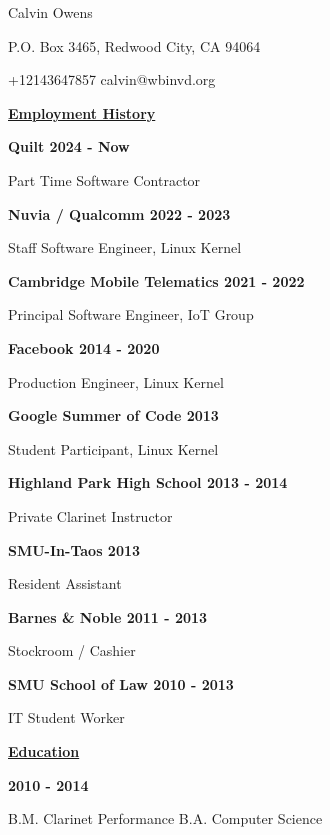 \documentclass[11pt]{article}
\begin{document}
\centerline{{\Huge \sc Calvin Owens}}
\centerline{P.O. Box 3465, Redwood City, CA 94064}
\centerline{+12143647857 \textbullet \hspace{1pt} calvin@wbinvd.org}

\noindent
\hrulefill

\centerline{\underline{\bf Employment History}}
\smallskip

\noindent\centerline{\bf Quilt \hfill 2024 - Now}
Part Time Software Contractor \\

\noindent\centerline{\bf Nuvia / Qualcomm \hfill 2022 - 2023}
Staff Software Engineer, Linux Kernel \\

\noindent\centerline{\bf Cambridge Mobile Telematics \hfill 2021 - 2022}
Principal Software Engineer, IoT Group \\

\noindent\centerline{\bf Facebook \hfill 2014 - 2020}
Production Engineer, Linux Kernel \\

\noindent\centerline{\bf Google Summer of Code \hfill 2013}
Student Participant, Linux Kernel \\

\noindent\centerline{\bf Highland Park High School \hfill 2013 - 2014}
Private Clarinet Instructor \\

\noindent\centerline{\bf SMU-In-Taos \hfill 2013}
Resident Assistant \\

\noindent\centerline{\bf Barnes \& Noble \hfill 2011 - 2013}
Stockroom / Cashier \\

\noindent\centerline{\bf SMU School of Law \hfill 2010 - 2013}
IT Student Worker

\noindent
\hrulefill

\centerline{\underline{\bf Education}}
\smallskip
{} \hfill {\bf 2010 - 2014}
\smallskip \\
\noindent\centerline{\hfill \textbullet \hspace{1pt} B.M. Clarinet Performance \hfill \textbullet \hspace{1pt} B.A. Computer Science \hfill }
\end{document}
